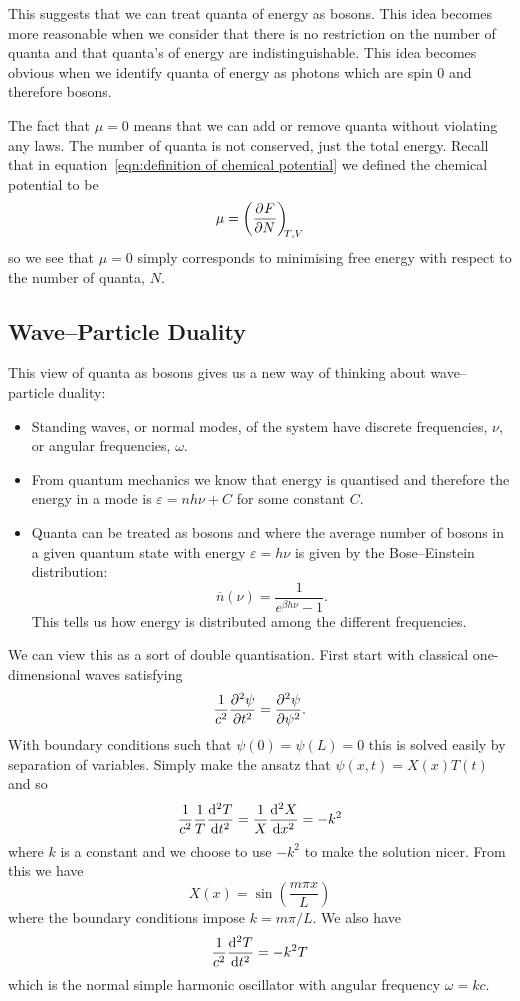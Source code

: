 \documentclass[a4paper]{article}
\newcommand{\mean}[1]{\overline{#1}}
\begin{document}
    This suggests that we can treat quanta of energy as bosons.
    This idea becomes more reasonable when we consider that there is no restriction on the number of quanta and that quanta's of energy are indistinguishable.
    This idea becomes obvious when we identify quanta of energy as photons which are spin 0 and therefore bosons.
    
    The fact that \(\mu = 0\) means that we can add or remove quanta without violating any laws.
    The number of quanta is not conserved, just the total energy.
    Recall that in equation~\ref{eqn:definition of chemical potential} we defined the chemical potential to be
    \[\mu = \left(\pdv[]{F}{N}\right)_{\!\!{T,V}}\]
    so we see that \(\mu = 0\) simply corresponds to minimising free energy with respect to the number of quanta, \(N\).
    
    \subsection{Wave--Particle Duality}
    This view of quanta as bosons gives us a new way of thinking about wave--particle duality:
    \begin{itemize}
        \item Standing waves, or normal modes, of the system have discrete frequencies, \(\nu\), or angular frequencies, \(\omega\).
        \item From quantum mechanics we know that energy is quantised and therefore the energy in a mode is \(\varepsilon = nh\nu + C\) for some constant \(C\).
        \item Quanta can be treated as bosons and where the average number of bosons in  a given quantum state with energy \(\varepsilon = h\nu\) is given by the Bose--Einstein distribution:
        \[\mean{n}(\nu) = \frac{1}{e^{\beta h\nu} - 1}.\]
        This tells us how energy is distributed among the different frequencies.
    \end{itemize}
    
    We can view this as a sort of double quantisation.
    First start with classical one-dimensional waves satisfying
    \[\frac{1}{c^2}\pdv[2]{\psi}{t} = \pdv[2]{\psi}{\psi}.\]
    With boundary conditions such that \(\psi(0) = \psi(L) = 0\) this is solved easily by separation of variables.
    Simply make the ansatz that \(\psi(x, t) = X(x)T(t)\) and so
    \[\frac{1}{c^2}\frac{1}{T}\dv[2]{T}{t} = \frac{1}{X}\dv[2]{X}{x} = -k^2\]
    where \(k\) is a constant and we choose to use \(-k^2\) to make the solution nicer.
    From this we have
    \[X(x) = \sin\left( \frac{m\pi x}{L} \right)\]
    where the boundary conditions impose \(k = m\pi/L\).
    We also have
    \[\frac{1}{c^2}\dv[2]{T}{t} = -k^2T\]
    which is the normal simple harmonic oscillator with angular frequency \(\omega = kc\).
    
\end{document}
